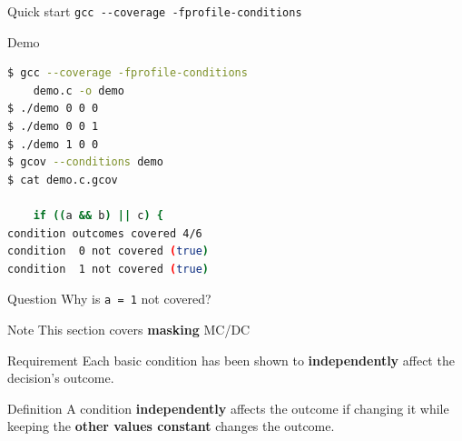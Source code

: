 \documentclass[xcolor = {dvipsnames, table}, aspectratio=169]{beamer}
\begin{document}
\begin{frame}
    \begin{block}{Quick start}
        \lstinline{gcc --coverage -fprofile-conditions}
    \end{block}
\end{frame}

\begin{frame}[fragile]
    \begin{block}{Demo}
        \begin{lstlisting}[language = sh, basicstyle = \scriptsize\ttfamily]
$ gcc --coverage -fprofile-conditions
    demo.c -o demo
$ ./demo 0 0 0
$ ./demo 0 0 1
$ ./demo 1 0 0
$ gcov --conditions demo
$ cat demo.c.gcov

    if ((a && b) || c) {
condition outcomes covered 4/6
condition  0 not covered (true)
condition  1 not covered (true)
        \end{lstlisting}
    \end{block}

    \begin{block}{Question}
        Why is \lstinline{a = 1} not covered?
    \end{block}
\end{frame}

\begin{frame}
    \begin{block}{Note}
        This section covers \textbf{masking} MC/DC
    \end{block}
\end{frame}

\begin{frame}
    \begin{block}{Requirement}
        Each basic condition has been shown to \textbf{independently} affect the
        decision’s outcome.
    \end{block}

    \begin{block}{Definition}
        A condition \textbf{independently} affects the outcome if changing it
        while keeping the \textbf{other values constant} changes the outcome.
    \end{block}
\end{frame}
\end{document}
